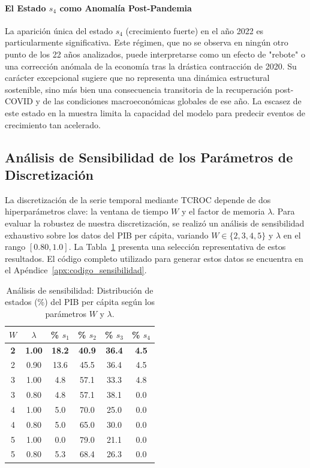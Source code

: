 \paragraph{El Estado \(s_4\) como Anomalía Post-Pandemia}
La aparición única del estado \(s_4\) (crecimiento fuerte) en el año 2022 es particularmente significativa. Este régimen, que no se observa en ningún otro punto de los 22 años analizados, puede interpretarse como un efecto de "rebote" o una corrección anómala de la economía tras la drástica contracción de 2020. Su carácter excepcional sugiere que no representa una dinámica estructural sostenible, sino más bien una consecuencia transitoria de la recuperación post-COVID y de las condiciones macroeconómicas globales de ese año. La escasez de este estado en la muestra limita la capacidad del modelo para predecir eventos de crecimiento tan acelerado.

\subsection{Análisis de Sensibilidad de los Parámetros de Discretización}
La discretización de la serie temporal mediante TCROC depende de dos hiperparámetros clave: la ventana de tiempo $W$ y el factor de memoria $\lambda$. Para evaluar la robustez de nuestra discretización, se realizó un análisis de sensibilidad exhaustivo sobre los datos del PIB per cápita, variando $W \in \{2, 3, 4, 5\}$ y $\lambda$ en el rango $[0.80, 1.0]$. La Tabla~\ref{tab:sensibilidad_tcroc} presenta una selección representativa de estos resultados. El código completo utilizado para generar estos datos se encuentra en el Apéndice~\ref{apx:codigo_sensibilidad}.

\begin{table}[H]
\centering
\caption{Análisis de sensibilidad: Distribución de estados (\%) del PIB per cápita según los parámetros $W$ y $\lambda$.}
\label{tab:sensibilidad_tcroc}
\begin{tabular}{cc|cccc}
\hline
\textbf{$W$} & \textbf{$\lambda$} & \textbf{\% $s_1$} & \textbf{\% $s_2$} & \textbf{\% $s_3$} & \textbf{\% $s_4$} \\
\hline
\textbf{2} & \textbf{1.00} & \textbf{18.2} & \textbf{40.9} & \textbf{36.4} & \textbf{4.5} \\
2 & 0.90 & 13.6 & 45.5 & 36.4 & 4.5 \\
\hline
3 & 1.00 & 4.8 & 57.1 & 33.3 & 4.8 \\
3 & 0.80 & 4.8 & 57.1 & 38.1 & 0.0 \\
\hline
4 & 1.00 & 5.0 & 70.0 & 25.0 & 0.0 \\
4 & 0.80 & 5.0 & 65.0 & 30.0 & 0.0 \\
\hline
5 & 1.00 & 0.0 & 79.0 & 21.1 & 0.0 \\
5 & 0.80 & 5.3 & 68.4 & 26.3 & 0.0 \\
\hline
\end{tabular}
\end{table}

